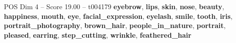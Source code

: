 \begin{textsample}{POS Dim 4 – Score 19.00 – t004179}  \label{ex:f4_pos_023}
\textbf{eyebrow}, \textbf{lips}, \textbf{skin}, \textbf{nose}, \textbf{beauty}, \textbf{happiness}, \textbf{mouth}, \textbf{eye}, \textbf{facial\_expression}, \textbf{eyelash}, \textbf{smile}, \textbf{tooth}, \textbf{iris}, \textbf{portrait\_photography}, \textbf{brown\_hair}, \textbf{people\_in\_nature}, \textbf{portrait}, \textbf{pleased}, \textbf{earring}, \textbf{step\_cutting}, \textbf{wrinkle}, \textbf{feathered\_hair}

\end{textsample}
